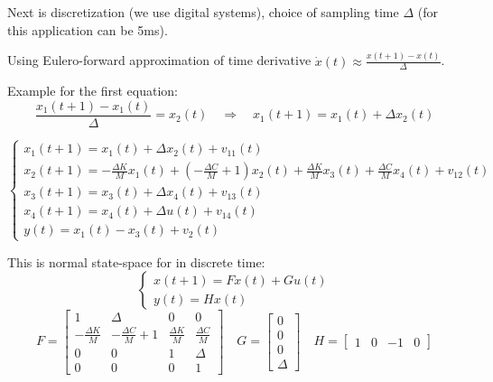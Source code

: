 \begin{example}
    Next is discretization (we use digital systems), choice of sampling time $\Delta$ (for this application can be 5ms).

    Using Eulero-forward approximation of time derivative $\dot{x}(t) \approx \frac{x(t+1)-x(t)}{\Delta}$.

    Example for the first equation:
    \[
        \frac{x_1(t+1)-x_1(t)}{\Delta} = x_2(t) \quad\Rightarrow\quad x_1(t+1) = x_1(t) + \Delta x_2(t)
    \]

    \[
        \begin{cases}
            x_1(t+1) = x_1(t) + \Delta x_2(t) + v_{11}(t) \\
            x_2(t+1) = -\frac{\Delta K}{M} x_1(t) + \left( -\frac{\Delta C}{M} + 1 \right)x_2(t) + \frac{\Delta K}{M} x_3(t) + \frac{\Delta C}{M} x_4(t) + v_{12}(t) \\
            x_3(t+1) = x_3(t) + \Delta x_4(t) + v_{13}(t) \\
            x_4(t+1) = x_4(t) + \Delta u(t) + v_{14}(t) \\
            y(t) = x_1(t) - x_3(t) + v_2(t)
        \end{cases}
    \]

    This is normal state-space for in discrete time:
    \[
        \begin{cases}
            x(t+1) = Fx(t) + Gu(t) \\
            y(t) = Hx(t)
        \end{cases}
    \]
    \[
        F = \begin{bmatrix}
            1 & \Delta & 0 & 0 \\
            -\frac{\Delta K}{M} & -\frac{\Delta C}{M}+1 & \frac{\Delta K}{M} & \frac{\Delta C}{M} \\
            0 & 0 & 1 & \Delta \\
            0 & 0 & 0 & 1
        \end{bmatrix}
        \quad G = \begin{bmatrix}
            0 \\ 0 \\ 0 \\ \Delta
        \end{bmatrix}
        \quad H = \begin{bmatrix}
            1 & 0 & -1 & 0
        \end{bmatrix}
    \]


\end{example}
